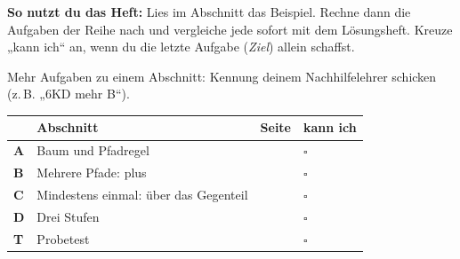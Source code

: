 \documentclass[11pt]{article}
\begin{document}
\par\smallskip
{}\par\medskip
\noindent\textbf{So nutzt du das Heft:} Lies im Abschnitt das Beispiel. Rechne dann die Aufgaben der Reihe nach und vergleiche jede sofort mit dem Lösungsheft. Kreuze „kann ich“ an, wenn du die letzte Aufgabe (\emph{Ziel}) allein schaffst.\par
\noindent Mehr Aufgaben zu einem Abschnitt: Kennung deinem Nachhilfelehrer schicken (z.\,B. „6KD mehr B“).\par\medskip
{\renewcommand{\arraystretch}{1.3}
\noindent\begin{tabular}{|>{\bfseries}p{10mm}|p{112mm}|>{\raggedleft\arraybackslash}p{10mm}|>{\centering\arraybackslash}p{14mm}|}\hline
\rowcolor{black!8} & \textbf{Abschnitt} & \textbf{Seite} & \textbf{kann ich}\\\hline
A & Baum und Pfadregel & \pageref{s:A} & $\square$\\\hline
B & Mehrere Pfade: plus & \pageref{s:B} & $\square$\\\hline
C & Mindestens einmal: über das Gegenteil & \pageref{s:C} & $\square$\\\hline
D & Drei Stufen & \pageref{s:D} & $\square$\\\hline
T & Probetest & \pageref{s:T} & $\square$\\\hline
\end{tabular}}\par\bigskip
\end{document}
